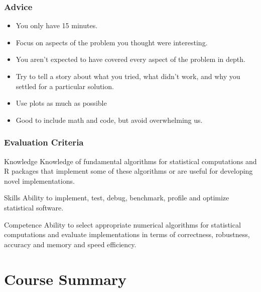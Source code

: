\documentclass[aspectratio=1610,onlytextwidth]{beamer}
\begin{document}
\begin{frame}[c]
  \frametitle{Advice}

  \begin{itemize}[<+->]
    \item You \alert{only} have 15 minutes.
    \item Focus on aspects of the problem you thought were interesting.
    \item You aren't expected to have covered every aspect of the problem in depth.
    \item Try to tell a story about what you tried, what didn't work, and why
          you settled for a particular solution.
    \item Use plots as much as possible
    \item Good to include math and code, but avoid overwhelming us.
  \end{itemize}
\end{frame}

\begin{frame}[c]
  \frametitle{Evaluation Criteria}

  \begin{block}{Knowledge}
    Knowledge of fundamental algorithms for statistical computations and R packages that implement some of these algorithms or are useful for developing novel implementations.
  \end{block}

  \pause
  \begin{block}{Skills}
    Ability to implement, test, debug, benchmark, profile and optimize statistical software.
  \end{block}

  \pause

  \begin{block}{Competence}
    Ability to select appropriate numerical algorithms for statistical computations and
    evaluate implementations in terms of correctness, robustness, accuracy and memory and speed efficiency.
  \end{block}

\end{frame}

\section{Course Summary}
\end{document}
